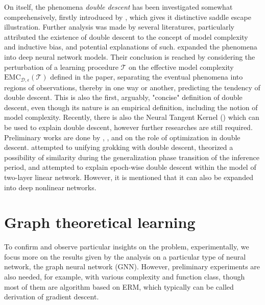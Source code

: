 \documentclass[10pt]{article} %
\begin{document}
On itself, the phenomena \textit{double descent} has been investigated somewhat comprehensively, firstly introduced by \cite{belkin_reconciling_2019}, which gives it distinctive saddle escape illustration. Further analysis was made by several literatures, particularly attributed the existence of double descent to the concept of model complexity and inductive bias, and potential explanations of such. \cite{nakkiran_deep_2019} expanded the phenomena into deep neural network models. Their conclusion is reached by considering the perturbation of a learning procedure $\mathcal{T}$ on the effective model complexity $\mathrm{EMC}_{\mathcal{D},\epsilon}(\mathcal{T})$ defined in the paper, separating the eventual phenomena into regions of observations, thereby in one way or another, predicting the tendency of double descent. This is also the first, arguably, "concise" definition of double descent, even though its nature is an empirical definition, including the notion of model complexity. Recently, there is also the Neural Tangent Kernel (\cite{Jacot:2018:NTK}) which can be used to explain double descent, however further researches are still required. Preliminary works are done by \cite{lafon_understanding_2024}, \cite{schaeffer_double_2023}, and \cite{liu2023understandingroleoptimizationdouble} on the role of optimization in double descent. \cite{davies_unifying_2023} attempted to unifying grokking with double descent, theorized a possibility of similarity during the generalization phase transition of the inference period, and \cite{olmin2024understandingepochwisedoubledescent} attempted to explain epoch-wise double descent within the model of two-layer linear network. However, it is mentioned that it can also be expanded into deep nonlinear networks. 

\section{Graph theoretical learning}

To confirm and observe particular insights on the problem, experimentally, we focus more on the results given by the analysis on a particular type of neural network, the graph neural network (GNN). However, preliminary experiments are also needed, for example, with various complexity and function class, though most of them are algorithm based on ERM, which typically can be called derivation of gradient descent. 
\end{document}
